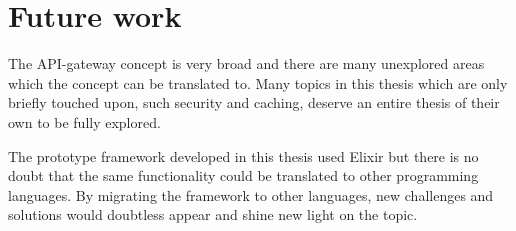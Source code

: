 \documentclass{cslthse-msc}
\begin{document}
\section{Future work}

The API-gateway concept is very broad and there are many unexplored areas which the concept can be translated to. Many topics in this thesis which are only briefly touched upon, such security and caching, deserve an entire thesis of their own to be fully explored.

The prototype framework developed in this thesis used Elixir but there is no doubt that the same functionality could be translated to other programming languages. By migrating the framework to other languages, new challenges and solutions would doubtless appear and shine new light on the topic. 

\cleardoublepage
{}
{}


\end{document}
